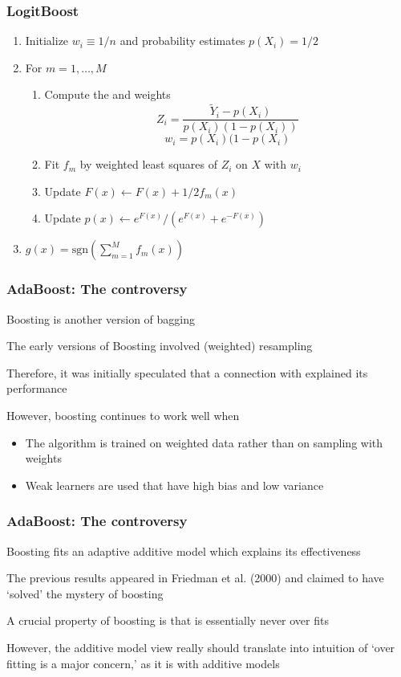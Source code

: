 \documentclass[12pt]{beamer}
\begin{document}
\begin{frame}[fragile]
\frametitle{LogitBoost}
\begin{enumerate}
\item Initialize $w_i \equiv 1/n$ and probability estimates $p(X_i) = 1/2$
\item For $m = 1,\ldots,M$
\begin{enumerate}
\item Compute the  and weights
\[
Z_i = \frac{\tilde{Y}_i - p(X_i)}{p(X_i)(1-p(X_i))}
\]
\[
w_i = p(X_i)(1-p(X_i)
\]
\item Fit $f_m$ by weighted least squares of $Z_i$ on $X$ with $w_i$

\item Update $F(x) \leftarrow F(x) + 1/2f_m(x)$
\item Update $p(x) \leftarrow e^{F(x)}/(e^{F(x)} + e^{-F(x)})$
\end{enumerate}
\item {} $g(x) = \textrm{sgn}\left(\sum_{m=1}^M f_m(x)\right)$
\end{enumerate}
\end{frame}



\begin{frame}[fragile]
\frametitle{AdaBoost: The controversy}
  Boosting is another version of bagging

\vsp
The early versions of Boosting involved (weighted) resampling

\vsp
Therefore, it was initially speculated that a connection with  explained its performance

\vsp
However, boosting continues to work well when
\begin{itemize}
\item The algorithm is trained on weighted data rather than on sampling with weights

\item Weak learners are used that have high bias and low variance

\end{itemize}
\end{frame}

\begin{frame}[fragile]
\frametitle{AdaBoost: The controversy}
  Boosting fits an adaptive additive model which explains its effectiveness

\vsp
The previous results appeared in Friedman et al. (2000) and claimed to have `solved' the mystery of boosting

\vsp
A crucial property of boosting is that is essentially never over fits

\vsp
However, the additive model view really should translate into intuition of `over fitting is a major concern,' as it is with
additive models
\end{frame}
\end{document}
